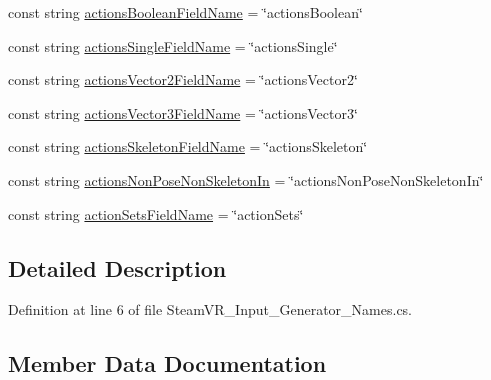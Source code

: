 \begin{DoxyCompactItemize}
\item 
const string \mbox{\hyperlink{class_valve_1_1_v_r_1_1_steam_v_r___input___generator___names_ad4549ccf2265f4f8ae48c8b3555b0e67}{actions\+Boolean\+Field\+Name}} = \char`\"{}actions\+Boolean\char`\"{}
\item 
const string \mbox{\hyperlink{class_valve_1_1_v_r_1_1_steam_v_r___input___generator___names_afdeb249fe11f3766d0f3455b5afc8a01}{actions\+Single\+Field\+Name}} = \char`\"{}actions\+Single\char`\"{}
\item 
const string \mbox{\hyperlink{class_valve_1_1_v_r_1_1_steam_v_r___input___generator___names_ac08584c0d48cd330cbf329784e8ef621}{actions\+Vector2\+Field\+Name}} = \char`\"{}actions\+Vector2\char`\"{}
\item 
const string \mbox{\hyperlink{class_valve_1_1_v_r_1_1_steam_v_r___input___generator___names_ad4aaa043e9615f770660504681325913}{actions\+Vector3\+Field\+Name}} = \char`\"{}actions\+Vector3\char`\"{}
\item 
const string \mbox{\hyperlink{class_valve_1_1_v_r_1_1_steam_v_r___input___generator___names_a9c027115023015e0080e42d7a840f976}{actions\+Skeleton\+Field\+Name}} = \char`\"{}actions\+Skeleton\char`\"{}
\item 
const string \mbox{\hyperlink{class_valve_1_1_v_r_1_1_steam_v_r___input___generator___names_ab2ddb0de654e93d0db323282907a1e9b}{actions\+Non\+Pose\+Non\+Skeleton\+In}} = \char`\"{}actions\+Non\+Pose\+Non\+Skeleton\+In\char`\"{}
\item 
const string \mbox{\hyperlink{class_valve_1_1_v_r_1_1_steam_v_r___input___generator___names_aea3636f5c17c23995bb3ec9a16fee2f3}{action\+Sets\+Field\+Name}} = \char`\"{}action\+Sets\char`\"{}
\end{DoxyCompactItemize}


\subsection{Detailed Description}


Definition at line 6 of file Steam\+V\+R\+\_\+\+Input\+\_\+\+Generator\+\_\+\+Names.\+cs.



\subsection{Member Data Documentation}
\mbox{\label{class_valve_1_1_v_r_1_1_steam_v_r___input___generator___names_ad4549ccf2265f4f8ae48c8b3555b0e67}} 
